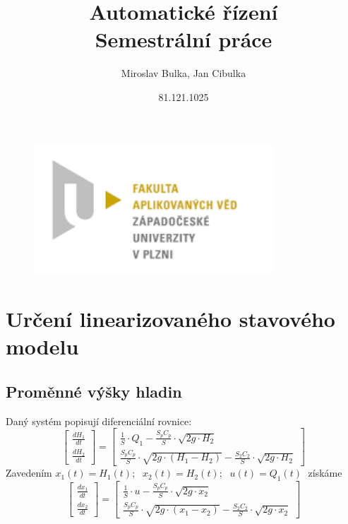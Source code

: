 \documentclass[12pt,a4paper]{article}
\title{Automatické řízení \\
	Semestrální práce}
\author{Miroslav Bulka, Jan Cibulka}
\date{81.121.1025}
\begin{document}
\maketitle

\begin{figure}[h]
	\centering
	\includegraphics[width=9cm]{obrazky/fav.png}
\end{figure}
\clearpage
\newpage



\newpage

\newpage

\section{Určení linearizovaného stavového modelu}
\subsection{Proměnné výšky hladin}\label{sec:2A} 

Daný systém popisují diferenciální rovnice:
\begin{equation}
\left [\begin{array}{cc}
\frac{dH_{1}}{dt} \\
\frac{dH_{2}}{dt}
\end{array}\right ] = 
\left [\begin{array}{cc}
\frac{1}{S}\cdot Q_{1}-\frac{S_{p}C_{p}}{S}\cdot \sqrt{2g\cdot H_{2}}\\
\frac{S_{p}C_{p}}{S}\cdot \sqrt{2g\cdot \left ( H_{1}-H_{2} \right )}-\frac{S_{2}C_{2}}{S}\cdot \sqrt{2g\cdot H_{2}}\end{array}\right ]
\end{equation}
Zavedením 
$ x_{1}(t)=H_{1}(t);\;$ 
$x_{2}(t)=H_{2}(t);\;$ 
$u(t)=Q_{1}(t)\; $
získáme
\begin{equation}
\left [\begin{array}{cc}
\frac{dx_{1}}{dt} \\
\frac{dx_{2}}{dt}
\end{array}\right ] = 
\left [\begin{array}{cc}
\frac{1}{S}\cdot u-\frac{S_{p}C_{p}}{S}\cdot \sqrt{2g\cdot x_{2}}\\
\frac{S_{p}C_{p}}{S}\cdot \sqrt{2g\cdot \left ( x_{1}-x_{2} \right )}-\frac{S_{2}C_{2}}{S}\cdot \sqrt{2g\cdot x_{2}}\end{array}\right ]
\end{equation}
\end{document}
